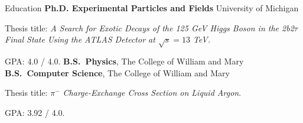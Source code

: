 \begin{rubric}{Education}
\entry*[2018 -- 2023]%
	\textbf{Ph.D. Experimental Particles and Fields} University of Michigan
	\par Thesis title: \emph{A Search for Exotic Decays of the 125 GeV Higgs Boson in the 2b2$\tau$ Final State Using the ATLAS Detector at $\sqrt{s}=13$ TeV.}
        \par GPA: 4.0 / 4.0.
%
\entry*[2014 -- 2018]%
	\textbf{B.S.~Physics}, The College of William and Mary
% 
\entry*[2014 -- 2018]%
	\textbf{B.S.~Computer Science}, The College of William and Mary
        \par Thesis title: \emph{$\pi^{-}$ Charge-Exchange Cross Section on Liquid Argon}.
        \par GPA: 3.92 / 4.0.
\end{rubric}